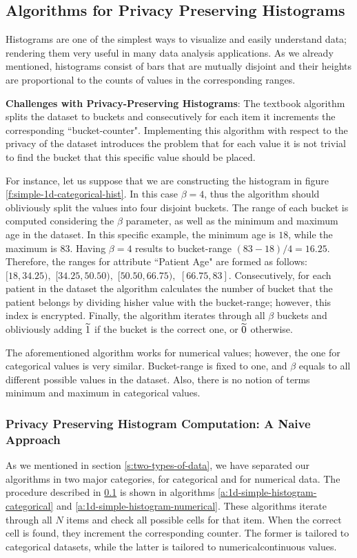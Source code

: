 \subsection{Algorithms for Privacy Preserving Histograms}\label{ss:histogram-algos}
Histograms are one of the simplest ways to visualize and easily understand data; rendering them very useful in many data analysis applications.
As we already mentioned, histograms consist of bars that are mutually disjoint and their heights are proportional to the counts of values in the corresponding ranges.

\textbf{Challenges with Privacy-Preserving Histograms}: The textbook algorithm splits the dataset to buckets and consecutively for each item it increments the corresponding ``bucket-counter".
Implementing this algorithm with respect to the privacy of the dataset introduces the problem that for each value it is not trivial to find the bucket that this specific value should be placed.

For instance, let us suppose that we are constructing the histogram in figure \ref{f:simple-1d-categorical-hist}.
In this case $\beta = 4$, thus the algorithm should obliviously split the values into four disjoint buckets.
The range of each bucket is computed considering the $\beta$ parameter, as well as the minimum and maximum age in the dataset.
In this specific example, the minimum age is $18$, while the maximum is $83$.
Having $\beta = 4$ results to bucket-range $(83 - 18) / 4 = 16.25$.
Therefore, the ranges for attribute ``Patient Age" are formed as follows: $[18, 34.25),$ $[34.25, 50.50),$ $[50.50, 66.75),$ $[66.75, 83]$.
Consecutively, for each patient in the dataset the algorithm calculates the number of bucket that the patient belongs by dividing his\myslash her value with the bucket-range; however, this index is encrypted.
Finally, the algorithm iterates through all $\beta$ buckets and obliviously adding $\widetilde{1}$ if the bucket is the correct one, or $\widetilde{0}$ otherwise.

The aforementioned algorithm works for numerical values; however, the one for categorical values is very similar.
Bucket-range is fixed to one, and $\beta$ equals to all different possible values in the dataset.
Also, there is no notion of terms minimum and maximum in categorical values.


\subsubsection{Privacy Preserving Histogram Computation: A Naive Approach}\label{sss:histogram-simple}
As we mentioned in section \ref{s:two-types-of-data}, we have separated our algorithms in two major categories, for categorical and for numerical data.
The procedure described in \ref{ss:histogram-algos} is shown in algorithms \ref{a:1d-simple-histogram-categorical} and \ref{a:1d-simple-histogram-numerical}.
These algorithms iterate through all $N$ items and check all possible cells for that item.
When the correct cell is found, they increment the corresponding counter.
The former is tailored to categorical datasets, while the latter is tailored to numerical\myslash continuous values.


